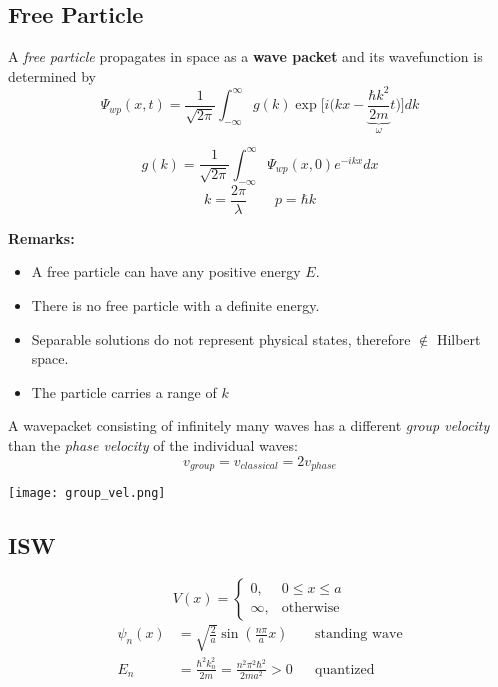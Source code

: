 \subsection{Free Particle}
A \textit{free particle} propagates in space as a \textbf{wave packet} and its wavefunction is determined by
\noindent\begin{equation*}
    \Psi_{wp}(x,t)=\frac{1}{\sqrt{2\pi}}\int_{-\infty}^{\infty}g(k)\exp\Biggl[i\Biggl(kx- \underbrace{\frac{\hbar k^{2}}{2m}}_{\omega}t\Biggr)\Biggr]dk
\end{equation*}

\noindent\begin{equation*}
    g(k)=\frac{1}{\sqrt{2\pi}}\int_{-\infty}^{\infty}\Psi_{wp}(x,0)e^{-ikx}dx
\end{equation*}
\begin{equation*}
    k  = \frac{2\pi}{\lambda}\qquad p  = \hbar k
\end{equation*}

\textbf{Remarks:}

\begin{itemize}
    \item A free particle can have any positive energy $E$.
    \item There is no free particle with a definite energy.
    \item Separable solutions do not represent physical states, therefore $\notin$ Hilbert space.
    \item The particle carries a range of $k$
\end{itemize}


A wavepacket consisting of infinitely many waves has a different \textit{group velocity} than the \textit{phase velocity} of the individual waves:
\noindent\begin{equation*}
    v_{group} = v_{classical} = 2v_{phase}
\end{equation*}

\begin{center}
    \texttt{[image: group\_vel.png]}
\end{center}

\subsection{ISW}
\noindent\begin{equation*}
    V(x)=\begin{cases}0,&0\le x\le a\\\infty,&\text{otherwise}\end{cases}
\end{equation*}
\noindent\begin{align*}
    \psi_{n}(x) & =\sqrt{\frac{2}{a}}\sin\left(\frac{n\pi}{a}x\right)                      &  & \text{standing wave} \\
    E_{n}       & =\frac{\hbar^{2}k_{n}^{2}}{2m}=\frac{n^{2}\pi^{2}\hbar^{2}}{2ma^{2}} > 0 &  & \text{quantized}
\end{align*}

